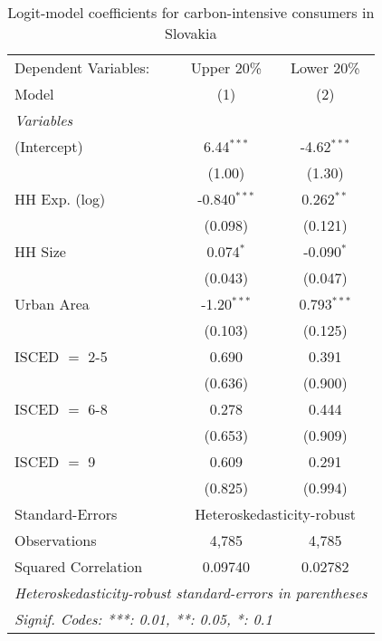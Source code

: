 
\begin{table}[htbp!]
   \centering
   \small
   \begin{adjustbox}{width = 1\textwidth, max height = 0.95\textheight, center}
      \begin{threeparttable}[b]
         \caption{\label{tab:Logit_1_SVK} Logit-model coefficients for carbon-intensive consumers in Slovakia}
         \begin{tabular}{lcc}
            \tabularnewline \midrule \midrule
            Dependent Variables: & Upper 20\%     & Lower 20\%\\   
            Model                & (1)            & (2)\\  
            \midrule
            \emph{Variables}\\
            (Intercept)          & 6.44$^{***}$   & -4.62$^{***}$\\   
                                 & (1.00)         & (1.30)\\   
            HH Exp. (log)        & -0.840$^{***}$ & 0.262$^{**}$\\   
                                 & (0.098)        & (0.121)\\   
            HH Size              & 0.074$^{*}$    & -0.090$^{*}$\\   
                                 & (0.043)        & (0.047)\\   
            Urban Area           & -1.20$^{***}$  & 0.793$^{***}$\\   
                                 & (0.103)        & (0.125)\\   
            ISCED $=$ 2-5        & 0.690          & 0.391\\   
                                 & (0.636)        & (0.900)\\   
            ISCED $=$ 6-8        & 0.278          & 0.444\\   
                                 & (0.653)        & (0.909)\\   
            ISCED $=$ 9          & 0.609          & 0.291\\   
                                 & (0.825)        & (0.994)\\   
            \midrule 
            Standard-Errors & \multicolumn{2}{c}{Heteroskedasticity-robust} \\ 
            Observations         & 4,785          & 4,785\\  
            Squared Correlation  & 0.09740        & 0.02782\\  
            \midrule \midrule
            \multicolumn{3}{l}{\emph{Heteroskedasticity-robust standard-errors in parentheses}}\\
            \multicolumn{3}{l}{\emph{Signif. Codes: ***: 0.01, **: 0.05, *: 0.1}}\\
         \end{tabular}
         

\end{threeparttable}
\end{adjustbox}
\end{table}
